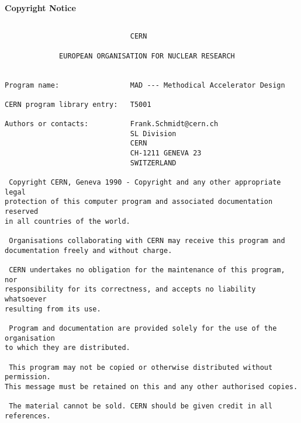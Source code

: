 

\begin{center}
{\bf\large Copyright Notice}
\end{center}


\begin{verbatim}

                              CERN

             EUROPEAN ORGANISATION FOR NUCLEAR RESEARCH


Program name:                 MAD --- Methodical Accelerator Design

CERN program library entry:   T5001

Authors or contacts:          Frank.Schmidt@cern.ch
                              SL Division
                              CERN
                              CH-1211 GENEVA 23
                              SWITZERLAND

 Copyright CERN, Geneva 1990 - Copyright and any other appropriate legal
protection of this computer program and associated documentation reserved
in all countries of the world. 

 Organisations collaborating with CERN may receive this program and
documentation freely and without charge. 

 CERN undertakes no obligation for the maintenance of this program, nor
responsibility for its correctness, and accepts no liability whatsoever
resulting from its use. 

 Program and documentation are provided solely for the use of the organisation
to which they are distributed. 

 This program may not be copied or otherwise distributed without permission.
This message must be retained on this and any other authorised copies. 

 The material cannot be sold. CERN should be given credit in all references. 


\end{verbatim}


